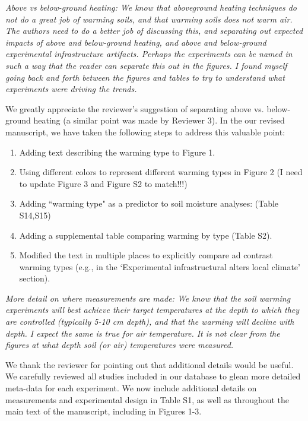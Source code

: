 \documentclass[11pt,a4paper]{letter}
\begin{document}
\begin{letter}{}
\par \emph{Above vs below-ground heating:  We know that aboveground heating techniques do not do a great job of warming soils, and that warming soils does not warm air. The authors need to do a better job of discussing this, and separating out expected impacts of above and below-ground heating, and above and below-ground experimental infrastructure artifacts.  Perhaps the experiments can be named in such a way that the reader can separate this out in the figures. I found myself going back and forth between the figures and tables to try to understand what experiments were driving the trends.} 
\par 
We greatly appreciate the reviewer's suggestion of separating above vs. below-ground heating (a similar point was made by Reviewer 3). In the our revised manuscript, we have taken the following steps to address this valuable point:
\begin{enumerate}
\item Adding text describing the warming type to Figure 1.
\item Using different colors  to represent different warming types in Figure 2 (I need to update Figure 3 and Figure S2 to match!!!)
\item Adding ``warming type" as a predictor to soil moisture analyses: (Table S14,S15)
\item Adding a supplemental table comparing warming by type (Table S2).
\item Modified the text in multiple places to explicitly compare ad contrast warming types (e.g., in the `Experimental infrastructural alters local climate' section). 
\end{enumerate}

\par \emph{More detail on where measurements are made:  We know that the soil warming experiments will best achieve their target temperatures at the depth to which they are controlled (typically 5-10 cm depth), and that the warming will decline with depth.  I expect the same is true for air temperature. It is not clear from the figures at what depth soil (or air) temperatures were measured.}
\par We thank the reviewer for pointing out that additional details would be useful. We carefully reviewed all studies included in our database to glean more detailed meta-data for each experiment. We now include additional details on measurements and experimental design in Table S1, as well as throughout the main text of the manuscript, including in Figures 1-3.


\end{letter}
\end{document}
